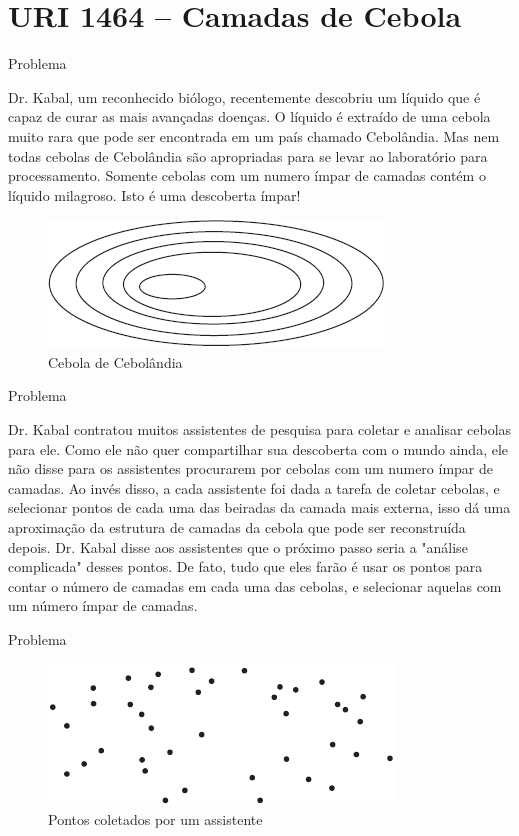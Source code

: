 \section{URI 1464 -- Camadas de Cebola}

\begin{frame}[fragile]{Problema}

Dr. Kabal, um reconhecido biólogo, recentemente descobriu um líquido que é capaz de curar as mais avançadas doenças. O líquido é extraído de uma cebola muito rara que pode ser encontrada em um país chamado Cebolândia. Mas nem todas cebolas de Cebolândia são apropriadas para se levar ao laboratório para processamento. Somente cebolas com um numero ímpar de camadas contém o líquido milagroso. Isto é uma descoberta ímpar!

\begin{figure}
    \centering
    \includegraphics[scale=0.75]{figure_1.png}
    \caption{Cebola de Cebolândia}
\end{figure}

\end{frame}

\begin{frame}[fragile]{Problema}

Dr. Kabal contratou muitos assistentes de pesquisa para coletar e analisar cebolas para ele. Como ele não quer compartilhar sua descoberta com o mundo ainda, ele não disse para os assistentes procurarem por cebolas com um numero ímpar de camadas. Ao invés disso, a cada assistente foi dada a tarefa de coletar cebolas, e selecionar pontos de cada uma das beiradas da camada mais externa, isso dá uma aproximação da estrutura de camadas da cebola que pode ser reconstruída depois. Dr. Kabal disse aos assistentes que o próximo passo seria a "análise complicada" desses pontos. De fato, tudo que eles farão é usar os pontos para contar o número de camadas em cada uma das cebolas, e selecionar aquelas com um número ímpar de camadas.

\end{frame}

\begin{frame}[fragile]{Problema}

\begin{figure}
    \centering
    \includegraphics[scale=1]{figure_2.png}
    \caption{Pontos coletados por um assistente}
\end{figure}

\end{frame}

